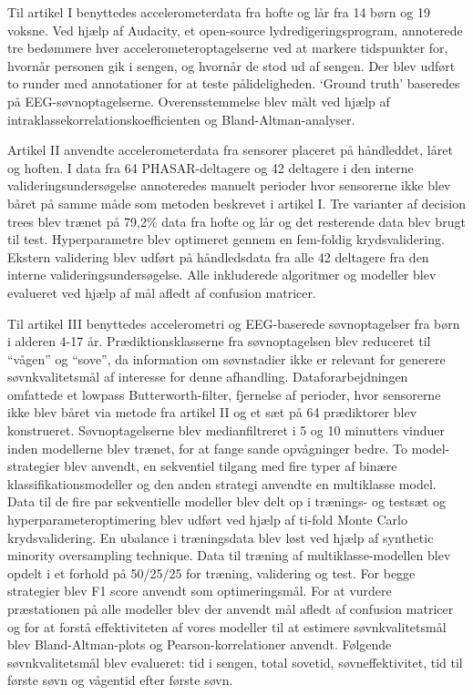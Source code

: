 \documentclass[
  9pt,
]{scrbook}
\begin{document}
Til artikel I benyttedes accelerometerdata fra hofte og lår fra 14 børn
og 19 voksne. Ved hjælp af Audacity, et open-source
lydredigeringsprogram, annoterede tre bedømmere hver
accelerometeroptagelserne ved at markere tidspunkter for, hvornår
personen gik i sengen, og hvornår de stod ud af sengen. Der blev udført
to runder med annotationer for at teste pålideligheden. `Ground truth'
baseredes på EEG-søvnoptagelserne. Overensstemmelse blev målt ved hjælp
af intraklassekorrelationskoefficienten og Bland-Altman-analyser.

Artikel II anvendte accelerometerdata fra sensorer placeret på
håndleddet, låret og hoften. I data fra 64 PHASAR-deltagere og 42
deltagere i den interne valideringsundersøgelse annoteredes manuelt
perioder hvor sensorerne ikke blev båret på samme måde som metoden
beskrevet i artikel I. Tre varianter af decision trees blev trænet på
79,2\% data fra hofte og lår og det resterende data blev brugt til test.
Hyperparametre blev optimeret gennem en fem-foldig krydsvalidering.
Ekstern validering blev udført på håndledsdata fra alle 42 deltagere fra
den interne valideringsundersøgelse. Alle inkluderede algoritmer og
modeller blev evalueret ved hjælp af mål afledt af confusion matricer.

Til artikel III benyttedes accelerometri og EEG-baserede søvnoptagelser
fra børn i alderen 4-17 år. Prædiktionsklasserne fra søvnoptagelsen blev
reduceret til ``vågen'' og ``sove'', da information om søvnstadier ikke
er relevant for generere søvnkvalitetsmål af interesse for denne
afhandling. Dataforarbejdningen omfattede et lowpass Butterworth-filter,
fjernelse af perioder, hvor sensorerne ikke blev båret via metode fra
artikel II og et sæt på 64 prædiktorer blev konstrueret.
Søvnoptagelserne blev medianfiltreret i 5 og 10 minutters vinduer inden
modellerne blev trænet, for at fange sande opvågninger bedre. To
model-strategier blev anvendt, en sekventiel tilgang med fire typer af
binære klassifikationsmodeller og den anden strategi anvendte en
multiklasse model. Data til de fire par sekventielle modeller blev delt
op i trænings- og testsæt og hyperparameteroptimering blev udført ved
hjælp af ti-fold Monte Carlo krydsvalidering. En ubalance i træningsdata
blev løst ved hjælp af synthetic minority oversampling technique. Data
til træning af multiklasse-modellen blev opdelt i et forhold på 50/25/25
for træning, validering og test. For begge strategier blev F1 score
anvendt som optimeringsmål. For at vurdere præstationen på alle modeller
blev der anvendt mål afledt af confusion matricer og for at forstå
effektiviteten af vores modeller til at estimere søvnkvalitetsmål blev
Bland-Altman-plots og Pearson-korrelationer anvendt. Følgende
søvnkvalitetsmål blev evalueret: tid i sengen, total sovetid,
søvneffektivitet, tid til første søvn og vågentid efter første søvn.
\end{document}
